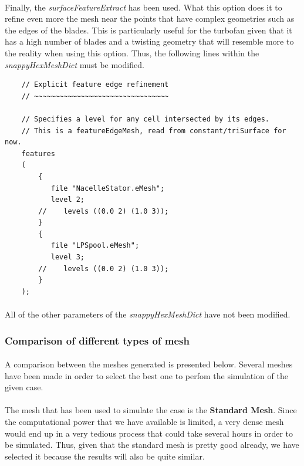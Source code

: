 \paragraph{}Finally, the \textit{surfaceFeatureExtract} has been used.  What this option does it to refine even more the mesh near the points that have complex geometries such as the edges of the blades. This is particularly useful for the turbofan given that it has a high number of blades and a twisting geometry that will resemble more to the reality when using this option. Thus, the following lines within the \textit{snappyHexMeshDict} must be modified.

\begin{footnotesize}
\begin{verbatim}
    // Explicit feature edge refinement
    // ~~~~~~~~~~~~~~~~~~~~~~~~~~~~~~~~

    // Specifies a level for any cell intersected by its edges.
    // This is a featureEdgeMesh, read from constant/triSurface for now.
    features
    (
        {
           file "NacelleStator.eMesh";
           level 2;
        //    levels ((0.0 2) (1.0 3));
        }
        {
           file "LPSpool.eMesh";
           level 3;
        //    levels ((0.0 2) (1.0 3));
        }
    );
\end{verbatim}
\end{footnotesize}

\paragraph{}All of the other parameters of the \textit{snappyHexMeshDict} have not been modified. 

\subsubsection{Comparison of different types of mesh}


\paragraph{}A comparison between the meshes generated is presented below. Several meshes have been made in order to select the best one to perfom the simulation of the given case.

\paragraph{}The mesh that has been used to simulate the case is the \textbf{Standard Mesh}. Since the computational power that we have available is limited, a very dense mesh would end up in a very tedious process that could take several hours in order to be simulated. Thus, given that the standard mesh is pretty good already, we have selected it because the results will also be quite similar.

